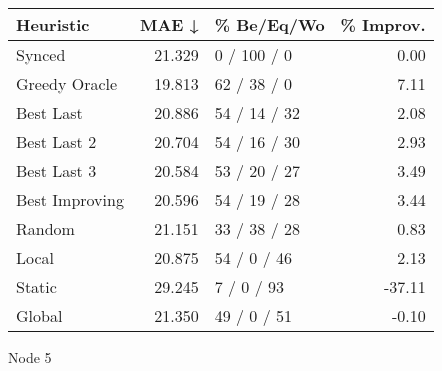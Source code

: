 \begin{tabular}{lrlr}
\toprule
\textbf{Heuristic} & \textbf{MAE ↓} & \textbf{\% Be/Eq/Wo} & \textbf{\% Improv.} \\
\midrule
            Synced &         21.329 &          0 / 100 / 0 &                0.00 \\
     Greedy Oracle &         19.813 &          62 / 38 / 0 &                7.11 \\
         Best Last &         20.886 &         54 / 14 / 32 &                2.08 \\
       Best Last 2 &         20.704 &         54 / 16 / 30 &                2.93 \\
       Best Last 3 &         20.584 &         53 / 20 / 27 &                3.49 \\
    Best Improving &         20.596 &         54 / 19 / 28 &                3.44 \\
            Random &         21.151 &         33 / 38 / 28 &                0.83 \\
             Local &         20.875 &          54 / 0 / 46 &                2.13 \\
            Static &         29.245 &           7 / 0 / 93 &              -37.11 \\
            Global &         21.350 &          49 / 0 / 51 &               -0.10 \\
\bottomrule
\end{tabular}
\caption{Node 5}
\label{tab:non_lr05_le2_bs2_5}
